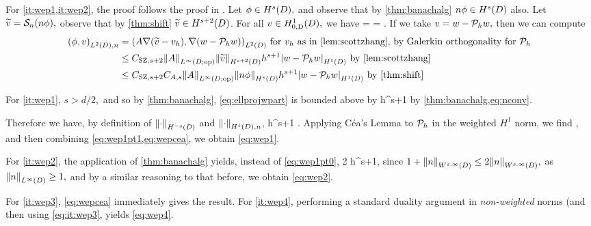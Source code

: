 For \cref{it:wep1,it:wep2}, the proof follows the proof in \cite[Theorem 5.8.3]{BrSc:08}. Let $\phi \in \HsD,$ and observe that by \cref{thm:banachalg} $n\phi\in \HsD$ also. Let $ \widetilde{v} = \mathcal S_{n}(n\phi),$ observe that by \cref{thm:shift} $\vtilde \in \Hfn{}{s+2}{D}$. For all $v \in \HozDD,$ we have
\beqs
{} =  = .
\eeqs
If we take $v = w-\mathcal P_{h} w,$ then we can compute
\begin{align}
\IPLtDn{\phi}{v} &= \IPLtD{A\grad\mleft(\vtilde - \vh\mright)}{\grad\mleft(w-\Ph w\mright)} \text{ for } \vh \text{ as in \cref{lem:scottzhang}, by Galerkin orthogonality for } \Ph\nonumber\\
&\leq \CSZfn{s+2}\NLiDop{A} \NHfn{s+2}{D}{\vtilde} h^{s+1} \SNHoD{w-\Ph w} \text{ by \cref{lem:scottzhang}}\nonumber\\
&\leq \CSZfn{s+2} \CAfn{s} \NLiDop{A} \NHfn{s}{D}{n\phi} h^{s+1}\SNHoD{w-\Ph w}\text{ by \cref{thm:shift}}\label{eq:ellprojwpart}
\end{align}

For \cref{it:wep1}, $s > d/2,$ and so by \cref{thm:banachalg}, \cref{eq:ellprojwpart} is bounded above by
\beq\label{eq:wep1pt0}
     h^{s+1}
\eeq
by \cref{thm:banachalg,eq:nconv}.

Therefore we have, by definition of $\NHnfn{-s}{D}{\cdot}$ and $\NHoDn{\cdot}$,
\beq\label{eq:wep1pt1}
 \leq {}    h^{s+1} .
\eeq
Applying C\'ea's Lemma to $\mathcal P_{h}$ in the weighted $H^1$ norm, we find
\beq\label{eq:wepcea}
 \leq {},
\eeq
and then combining \cref{eq:wep1pt1,eq:wepcea}, we obtain \cref{eq:wep1}.

For \cref{it:wep2}, the application of \cref{thm:banachalg} yields, instead of \cref{eq:wep1pt0},
\beq\label{eq:wep2pt1}
2     h^{s+1},
\eeq
since $1 + \NWsiD{n} \leq 2\NWsiD{n},$ as $\NLiD{n} \geq 1,$ and by a similar reasoning to that before, we obtain \cref{eq:wep2}.

For \cref{it:wep3}, \cref{eq:wepcea} immediately gives the result. For \cref{it:wep4}, performing a standard duality argument in \emph{non-weighted} norms (and then using \cref{eq:it:wep3}, yields \cref{eq:wep4}.
\epf


